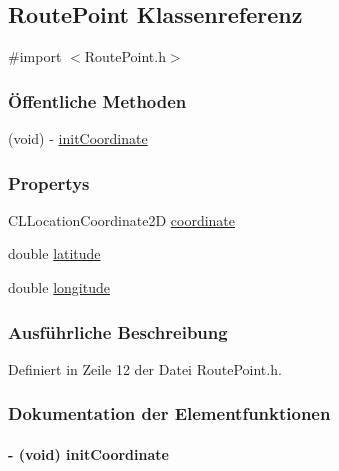 \hypertarget{interface_route_point}{
\subsection{RoutePoint Klassenreferenz}
\label{interface_route_point}
}


{\ttfamily \#import $<$RoutePoint.h$>$}\subsubsection*{Öffentliche Methoden}
\begin{DoxyCompactItemize}
\item 
(void) -\/ \hyperlink{interface_route_point_a6aca83d2fe3e07a4026ad60302315536}{initCoordinate}
\end{DoxyCompactItemize}
\subsubsection*{Propertys}
\begin{DoxyCompactItemize}
\item 
CLLocationCoordinate2D \hyperlink{interface_route_point_a477ee3d0030bfda3cc26ef34878913fc}{coordinate}
\item 
double \hyperlink{interface_route_point_a1a773711fc9a94e1a09febc90c9eec13}{latitude}
\item 
double \hyperlink{interface_route_point_a0396841a97d252adb4636291e6303435}{longitude}
\end{DoxyCompactItemize}


\subsubsection{Ausführliche Beschreibung}


Definiert in Zeile 12 der Datei RoutePoint.h.

\subsubsection{Dokumentation der Elementfunktionen}
\hypertarget{interface_route_point_a6aca83d2fe3e07a4026ad60302315536}{
\paragraph[{initCoordinate}]{\setlength{\rightskip}{0pt plus 5cm}-\/ (void) initCoordinate }\hfill}
\label{interface_route_point_a6aca83d2fe3e07a4026ad60302315536}


